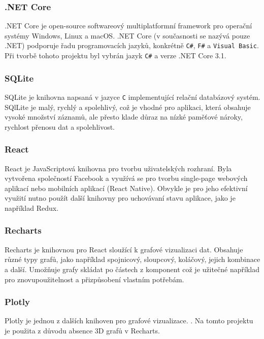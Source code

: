 \documentclass[czech,master,dept460,male,cpp,cpdeclaration,oneside]{diploma}
\begin{document}
\subsubsection*{.NET Core}
.NET Core\autocite{NETCORE} je open-source softwareový multiplatformní framework pro operační systémy Windows, Linux a macOS. .NET Core (v současnosti se nazývá pouze .NET) podporuje řadu programovacích jazyků, konkrétně \texttt{C\#}, \texttt{F\#} a \texttt{Visual Basic}. Při tvorbě tohoto projektu byl vybrán jazyk \texttt{C\#} a verze .NET Core 3.1.

\subsubsection*{SQLite}
SQLite\autocite{SQLite} je knihovna napsaná v jazyce \texttt{C} implementující relační databázový systém. SQlLite je malý, rychlý a spolehlivý, což je vhodné pro aplikaci, která obsahuje vysoké množství záznamů, ale přesto klade důraz na nízké paměťové nároky, rychlost přenosu dat a spolehlivost.

\subsubsection*{React}
React\autocite{React} je JavaScriptová knihovna pro tvorbu uživatelských rozhraní. Byla vytvořena společností Facebook a využívá se pro tvorbu single-page webových aplikací nebo mobilních aplikací (React Native). Obvykle je pro jeho efektivní využití nutno použít další knihovny pro uchovávaní stavu aplikace, jako je například Redux. 

\clearpage

\subsubsection*{Recharts}
Recharts\autocite{Recharts} je knihovnou pro React sloužící k grafové vizualizaci dat. Obsahuje různé typy grafů, jako například spojnicový, sloupcový, koláčový, jejich kombinace a další. Umožňuje grafy skládat po částech z komponent což je užitečné například pro znovupoužitelnost a přizpůsobení vlastním potřebám.

\subsubsection*{Plotly}
Plotly\autocite{Plotly} je jednou z dalších knihoven pro grafové vizualizace. . Na tomto projektu je použita z důvodu absence 3D grafů v Recharts.
\end{document}
